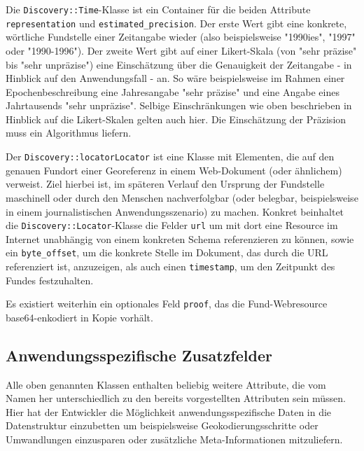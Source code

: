 Die \texttt{Discovery::Time}-Klasse ist ein Container für die beiden Attribute \texttt{representation} und \texttt{estimated\_precision}. Der erste Wert gibt eine konkrete, wörtliche Fundstelle einer Zeitangabe wieder (also beispielsweise "1990ies", "1997" oder "1990-1996"). Der zweite Wert gibt auf einer Likert-Skala (von "sehr präzise" bis "sehr unpräzise") eine Einschätzung über die Genauigkeit der Zeitangabe - in Hinblick auf den Anwendungsfall - an. So wäre beispielsweise im Rahmen einer Epochenbeschreibung eine Jahresangabe "sehr präzise" und eine Angabe eines Jahrtausends "sehr unpräzise". Selbige Einschränkungen wie oben beschrieben in Hinblick auf die Likert-Skalen gelten auch hier. Die Einschätzung der Präzision muss ein Algorithmus liefern.

Der \texttt{Discovery::locatorLocator} ist eine Klasse mit Elementen, die auf den genauen Fundort einer Georeferenz in einem Web-Dokument (oder ähnlichem) verweist. Ziel hierbei ist, im späteren Verlauf den Ursprung der Fundstelle maschinell oder durch den Menschen nachverfolgbar (oder belegbar, beispielsweise in einem journalistischen Anwendungsszenario) zu machen. Konkret beinhaltet die \texttt{Discovery::Locator}-Klasse die Felder \texttt{url} um mit dort eine Resource im Internet unabhängig von einem konkreten Schema referenzieren zu können, sowie ein \texttt{byte\_offset}, um die konkrete Stelle im Dokument, das durch die URL referenziert ist, anzuzeigen, als auch einen \texttt{timestamp}, um den Zeitpunkt des Fundes festzuhalten.
  
Es existiert weiterhin ein optionales Feld \texttt{proof}, das die Fund-Webresource base64-enkodiert in Kopie vorhält.

\subsection{Anwendungsspezifische Zusatzfelder}
Alle oben genannten Klassen enthalten beliebig weitere Attribute, die vom Namen her unterschiedlich zu den bereits vorgestellten Attributen sein müssen. Hier hat der Entwickler die Möglichkeit anwendungsspezifische Daten in die Datenstruktur einzubetten um beispielsweise Geokodierungsschritte oder Umwandlungen einzusparen oder zusätzliche Meta-Informationen mitzuliefern.

